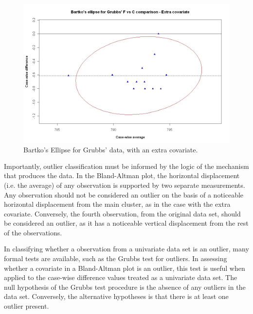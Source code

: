 \documentclass[Main.tex]{subfiles}
\begin{document}
	\begin{figure}[h!]
		\includegraphics[width=130mm]{images/GrubbsBartko2.jpeg}
		\caption{Bartko's Ellipse for Grubbs' data, with an extra covariate.}\label{GrubbsBartko2}
	\end{figure}
	
	
	Importantly, outlier classification must be informed by the logic of the
	mechanism that produces the data. In the Bland-Altman plot, the horizontal displacement (i.e. the average) of any
	observation is supported by two separate measurements. Any
	observation should not be considered an outlier on the basis of a
	noticeable horizontal displacement from the main cluster, as in
	the case with the extra covariate. Conversely, the fourth
	observation, from the original data set, should be considered an
	outlier, as it has a noticeable vertical displacement from the
	rest of the observations.
	
	
	
	In classifying whether a observation from a univariate data set is
	an outlier, many formal tests are available, such as the Grubbs test for outliers. In assessing
	whether a covariate in a Bland-Altman plot is an outlier, this
	test is useful when applied to the case-wise difference values treated as a
	univariate data set. The null hypothesis of the Grubbs test procedure is the absence
	of any outliers in the data set. Conversely, the alternative hypotheses is that there is at least one outlier
	present.
	
\end{document}
